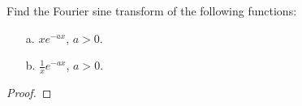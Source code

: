 \begin{problem}{2.15}
  Find the Fourier sine transform of the following functions:
  \begin{enumerate}
    \item[a.] $x e^{-a x}$, $a > 0$.
    \item [b.] $\displaystyle \frac{1}{x} e^{-ax}$, $a > 0$.
  \end{enumerate}
\end{problem}

\begin{proof}
\end{proof}
\newpage
